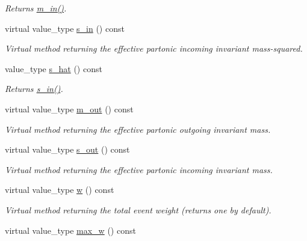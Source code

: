 \begin{DoxyCompactItemize}
\begin{DoxyCompactList}\small\item\em Returns \hyperlink{a00451_a422a6b7a79690e7bae81713bd8eb3b15}{m\+\_\+in()}. \end{DoxyCompactList}\item 
virtual value\+\_\+type \hyperlink{a00451_a0be9371536eabaa6ea77a4f7e2786aea}{s\+\_\+in} () const 
\begin{DoxyCompactList}\small\item\em Virtual method returning the effective partonic incoming invariant mass-\/squared. \end{DoxyCompactList}\item 
\hypertarget{a00451_aa7f37efbcfeabe4a587c93e65a97eb78}{}value\+\_\+type \hyperlink{a00451_aa7f37efbcfeabe4a587c93e65a97eb78}{s\+\_\+hat} () const \label{a00451_aa7f37efbcfeabe4a587c93e65a97eb78}

\begin{DoxyCompactList}\small\item\em Returns \hyperlink{a00451_aeb270d6a68cd7d9157848609250c652c}{s\+\_\+in()}. \end{DoxyCompactList}\item 
virtual value\+\_\+type \hyperlink{a00451_ac5d618064b41d7f05566ecf24cbd61c9}{m\+\_\+out} () const 
\begin{DoxyCompactList}\small\item\em Virtual method returning the effective partonic outgoing invariant mass. \end{DoxyCompactList}\item 
virtual value\+\_\+type \hyperlink{a00451_a2ac96657fc9d9400a5466da3e2b6d6e5}{s\+\_\+out} () const 
\begin{DoxyCompactList}\small\item\em Virtual method returning the effective partonic incoming invariant mass. \end{DoxyCompactList}\item 
\hypertarget{a00451_ae452c2c9e82b6e784bd32618c81d5ab1}{}virtual value\+\_\+type \hyperlink{a00451_ae452c2c9e82b6e784bd32618c81d5ab1}{w} () const \label{a00451_ae452c2c9e82b6e784bd32618c81d5ab1}

\begin{DoxyCompactList}\small\item\em Virtual method returning the total event weight (returns one by default). \end{DoxyCompactList}\item 
\hypertarget{a00451_ac50bcb2c604b7cd12da4f27ef3fb4414}{}virtual value\+\_\+type \hyperlink{a00451_ac50bcb2c604b7cd12da4f27ef3fb4414}{max\+\_\+w} () const \label{a00451_ac50bcb2c604b7cd12da4f27ef3fb4414}


\end{DoxyCompactItemize}
